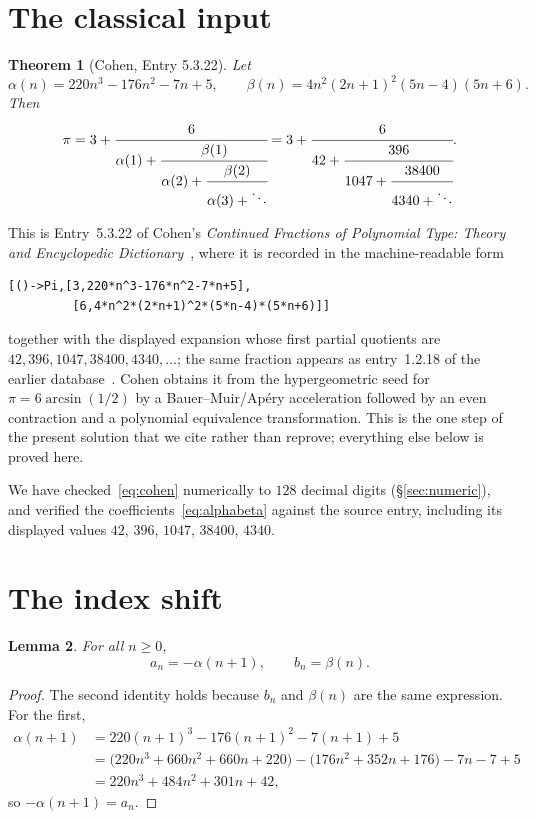 \documentclass[11pt]{article}
\newtheorem{theorem}{Theorem}[section]
\newtheorem{lemma}[theorem]{Lemma}
\theoremstyle{remark}
\begin{document}
\section{The classical input}

\begin{theorem}[Cohen, Entry 5.3.22]\label{thm:cohen}
Let
\begin{equation}\label{eq:alphabeta}
\alpha(n) = 220n^3 - 176n^2 - 7n + 5,
\qquad
\beta(n) = 4n^2(2n+1)^2(5n-4)(5n+6).
\end{equation}
Then
\begin{equation}\label{eq:cohen}
\pi = 3 + \cfrac{6}{\alpha(1) + \cfrac{\beta(1)}{\alpha(2) +
\cfrac{\beta(2)}{\alpha(3) + \ddots}}}
= 3 + \cfrac{6}{42 + \cfrac{396}{1047 + \cfrac{38400}{4340 + \ddots}}}.
\end{equation}
\end{theorem}

This is Entry~5.3.22 of Cohen's \emph{Continued Fractions of Polynomial Type:
Theory and Encyclopedic Dictionary}~\cite{Cohen2026}, where it is recorded in
the machine-readable form
\begin{verbatim}
[()->Pi,[3,220*n^3-176*n^2-7*n+5],
         [6,4*n^2*(2*n+1)^2*(5*n-4)*(5*n+6)]]
\end{verbatim}
together with the displayed expansion whose first partial quotients are
$42, 396, 1047, 38400, 4340,\dots$; the same fraction appears as entry~1.2.18 of
the earlier database~\cite{Cohen2024}. Cohen obtains it from the hypergeometric
seed for $\pi = 6\arcsin(1/2)$ by a Bauer--Muir/Ap\'ery acceleration followed by
an even contraction and a polynomial equivalence transformation. This is the one
step of the present solution that we cite rather than reprove; everything else
below is proved here.

We have checked~\eqref{eq:cohen} numerically to $128$ decimal digits
(\S\ref{sec:numeric}), and verified the coefficients~\eqref{eq:alphabeta}
against the source entry, including its displayed values $42$, $396$, $1047$,
$38400$, $4340$.

\section{The index shift}

\begin{lemma}\label{lem:shift}
For all $n \ge 0$,
\[
a_n = -\alpha(n+1), \qquad b_n = \beta(n).
\]
\end{lemma}

\begin{proof}
The second identity holds because $b_n$ and $\beta(n)$ are the same expression.
For the first,
\begin{align*}
\alpha(n+1) &= 220(n+1)^3 - 176(n+1)^2 - 7(n+1) + 5\\
&= \bigl(220n^3 + 660n^2 + 660n + 220\bigr)
 - \bigl(176n^2 + 352n + 176\bigr) - 7n - 7 + 5\\
&= 220n^3 + 484n^2 + 301n + 42,
\end{align*}
so $-\alpha(n+1) = a_n$.
\end{proof}
\end{document}
